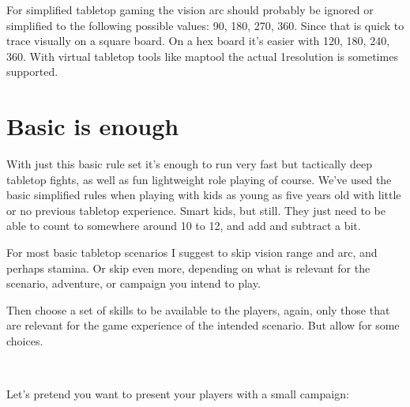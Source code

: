 For simplified tabletop gaming the vision arc should probably be ignored or simplified to the following possible values: 90, 180, 270, 360\degree. Since that is quick to trace visually on a square board. On a hex board it's easier with 120, 180, 240, 360\degree. With virtual tabletop tools like maptool the actual 1\degrees resolution is sometimes supported.

%


\section*{Basic is enough}
With just this basic rule set it's enough to run very fast but tactically deep tabletop fights, as well as fun lightweight role playing of course. We've used the basic simplified rules when playing with kids as young as five years old with little or no previous tabletop experience. Smart kids, but still. They just need to be able to count to somewhere around 10 to 12, and add and subtract a bit.

For most basic tabletop scenarios I suggest to skip vision range and arc, and perhaps stamina. Or skip even more, depending on what is relevant for the scenario, adventure, or campaign you intend to play.

Then choose a set of skills to be available to the players, again, only those that are relevant for the game experience of the intended scenario. But allow for some choices.

\

\noindent Let's pretend you want to present your players with a small campaign:

